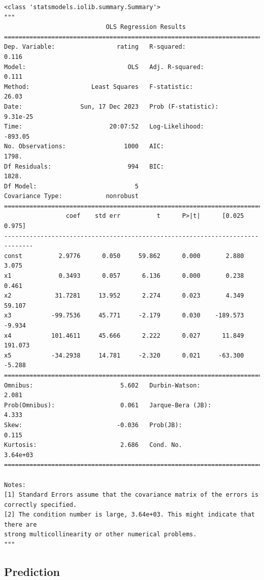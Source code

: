 \documentclass[
  letterpaper,
]{krantz}
\begin{document}
\begin{verbatim}
<class 'statsmodels.iolib.summary.Summary'>
"""
                            OLS Regression Results                            
==============================================================================
Dep. Variable:                 rating   R-squared:                       0.116
Model:                            OLS   Adj. R-squared:                  0.111
Method:                 Least Squares   F-statistic:                     26.03
Date:                Sun, 17 Dec 2023   Prob (F-statistic):           9.31e-25
Time:                        20:07:52   Log-Likelihood:                -893.05
No. Observations:                1000   AIC:                             1798.
Df Residuals:                     994   BIC:                             1828.
Df Model:                           5                                         
Covariance Type:            nonrobust                                         
==============================================================================
                 coef    std err          t      P>|t|      [0.025      0.975]
------------------------------------------------------------------------------
const          2.9776      0.050     59.862      0.000       2.880       3.075
x1             0.3493      0.057      6.136      0.000       0.238       0.461
x2            31.7281     13.952      2.274      0.023       4.349      59.107
x3           -99.7536     45.771     -2.179      0.030    -189.573      -9.934
x4           101.4611     45.666      2.222      0.027      11.849     191.073
x5           -34.2938     14.781     -2.320      0.021     -63.300      -5.288
==============================================================================
Omnibus:                        5.602   Durbin-Watson:                   2.081
Prob(Omnibus):                  0.061   Jarque-Bera (JB):                4.333
Skew:                          -0.036   Prob(JB):                        0.115
Kurtosis:                       2.686   Cond. No.                     3.64e+03
==============================================================================

Notes:
[1] Standard Errors assume that the covariance matrix of the errors is correctly specified.
[2] The condition number is large, 3.64e+03. This might indicate that there are
strong multicollinearity or other numerical problems.
"""
\end{verbatim}

\subsection{Prediction}\label{prediction}
\end{document}
